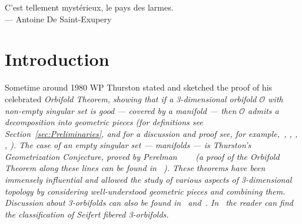 \documentclass[12pt,reqno]{amsart}
\theoremstyle{plain}
\theoremstyle{definition}
\numberwithin{subcase}{case}
\theoremstyle{plain}
\theoremstyle{definition}
\newcommand{\OO}{\mathcal{O}}
\begin{document}
\clearpage\maketitle
\thispagestyle{empty}


  
\begin{flushright}
C'est tellement myst\'erieux, le pays des larmes.\\[4pt]
{\scriptsize --- Antoine De Saint-Exupery}
\end{flushright}

\bigskip


\section{Introduction}\label{sec:introduction}


Sometime around 1980 WP Thurston stated and sketched the proof of his celebrated \em Orbifold Theorem\em, showing that if a 3-dimensional orbifold \(\OO\) with non-empty singular set is \em good \em --- covered by a manifold --- then \(\OO\) admits a decomposition into geometric pieces (for definitions see Section~\ref{sec:Preliminaries}, and  for a discussion and proof see, for example,~\cite{thurston}, \cite{boileau}, \cite{MR2060653}, \cite{cooper}, \cite{MR1844891}). 
The case of an empty singular set --- manifolds --- is Thurston's Geometrization Conjecture,  proved by Perelman~\cite{perelman2}
~\cite{perelman1}~\cite{perelman3} (a proof of the Orbifold Theorem along these lines can be found in ~\cite{MR3244330}).  These theorems have been immensely influential and allowed the  study of various aspects of 3-dimensional topology by considering well-understood geometric pieces and combining them.  Discussion about 3-orbifolds can also be found in~\cite{ConwayBurgielGoodmanStrauss} 
and~\cite{Montesinos}.
In~\cite{BonahonSiebenmann} the reader can find the classification of Seifert fibered 3-orbifolds.
\end{document}
